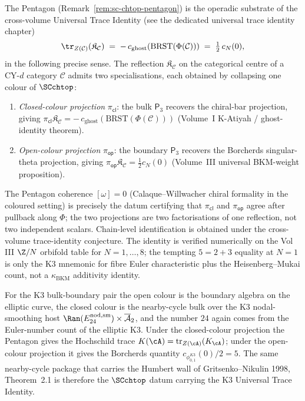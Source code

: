 \begin{remark}
\label{rem:pentagon-trace-identity}
The Pentagon (Remark~\ref{rem:sc-chtop-pentagon}) is the operadic
substrate of the cross-volume Universal Trace Identity (see the
dedicated universal trace identity chapter)
\[
 \tr_{Z(\mathcal C)}(\mathfrak K_{\mathcal C})
 \;=\; -\,c_{\mathrm{ghost}}(\mathrm{BRST}(\Phi(\mathcal C)))
 \;=\; \tfrac{1}{2}\,c_N(0),
\]
in the following precise sense. The reflection
$\mathfrak K_{\mathcal C}$ on the categorical centre of a CY-$d$
category $\mathcal C$ admits two specialisations, each obtained by
collapsing one colour of $\SCchtop$:
\begin{enumerate}[label=\textup{(\roman*)}]
\item \emph{Closed-colour projection} $\pi_{\mathsf{cl}}$: the bulk
$\mathsf P_3$ recovers the chiral-bar projection, giving
$\pi_{\mathsf{cl}} \mathfrak K_{\mathcal C} = -\,c_{\mathrm{ghost}}(\mathrm{BRST}(\Phi(\mathcal C)))$
(Volume~I K-Atiyah / ghost-identity theorem).
\item \emph{Open-colour projection} $\pi_{\mathsf{op}}$: the boundary
$\mathsf P_3$ recovers the Borcherds singular-theta projection,
giving $\pi_{\mathsf{op}} \mathfrak K_{\mathcal C} = \tfrac12 c_N(0)$
(Volume~III universal BKM-weight proposition).
\end{enumerate}
The Pentagon coherence $[\omega] = 0$ (Calaque--Willwacher chiral
formality in the coloured setting) is precisely the datum certifying
that $\pi_{\mathsf{cl}}$ and $\pi_{\mathsf{op}}$ agree after pullback
along $\Phi$; the two projections are two factorisations of one
reflection, not two independent scalars. Chain-level identification is
obtained under the cross-volume trace-identity conjecture.
The identity is verified numerically on the Vol III $\Z/N$ orbifold
table for $N = 1, \ldots, 8$; the tempting $5=2+3$ equality at $N=1$
is only the K3 mnemonic for fibre Euler characteristic plus the
Heisenberg--Mukai count, not a $\kappa_{\mathrm{BKM}}$ additivity
identity.
\end{remark}

\begin{example}
\label{ex:sc-pentagon-k3-trace}
For the K3 bulk-boundary pair the open colour is the boundary algebra
on the elliptic curve, the closed colour is the nearby-cycle bulk over
the K3 nodal-smoothing host
$\Ran(E^{\mathrm{nod,sm}}_{24}) \times \overline{\mathcal{A}}_2$, and
the number $24$ again comes from the Euler-number count of the elliptic
K3. Under the closed-colour projection the Pentagon gives the Hochschild
trace $K(\cA)=\mathrm{tr}_{Z(\cA)}(K_\cA)$; under the open-colour
projection it gives the Borcherds quantity
$c_{\phi_{0,1}^{K3}}(0)/2=5$. The same
nearby-cycle package that carries the Humbert wall of
Gritsenko--Nikulin 1998, Theorem~2.1 is therefore the
$\SCchtop$ datum carrying the K3 Universal Trace Identity.
\end{example}

